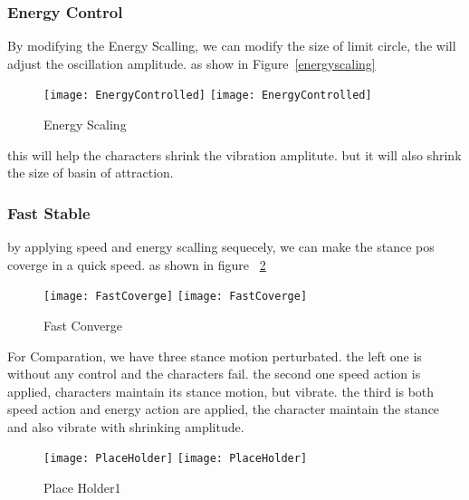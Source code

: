 \subsubsection*{Energy Control}
By modifying the Energy Scalling, we can modify the size of limit circle, the will adjust the oscillation amplitude.
as show in Figure~\ref{energyscaling}
\begin{figure}[!htbp]
  \begin{center}
    \leavevmode
    \ifpdf
      \texttt{[image: EnergyControlled]}
    \else
      \texttt{[image: EnergyControlled]}
    \fi
    \caption{Energy Scaling}
    \label{fig:energyscaling}
\end{center}
\end{figure}

this will help the characters shrink the vibration amplitute.
but it will also shrink the size of basin of attraction.




\subsubsection*{Fast Stable}
by applying speed and energy scalling sequecely, we can make the stance pos coverge in a quick speed.
as shown in figure ~\ref{fig:fastconverg}
\begin{figure}[!htbp]
  \begin{center}
    \leavevmode
    \ifpdf
      \texttt{[image: FastCoverge]}
    \else
      \texttt{[image: FastCoverge]}
    \fi
    \caption{Fast Converge}
    \label{fig:fastconverg}
\end{center}
\end{figure}


For Comparation, we have three stance motion perturbated.
the left one is without any control and the characters fail.
the second one speed action is applied, characters maintain its stance motion, but vibrate.
the third is  both speed action and energy action are applied, the character maintain the stance and also vibrate with shrinking amplitude.

\begin{figure}[!htbp]
  \begin{center}
    \leavevmode
    \ifpdf
      \texttt{[image: PlaceHolder]}
    \else
      \texttt{[image: PlaceHolder]}
    \fi
    \caption{Place Holder1}
    \label{fig:stancefall}
\end{center}
\end{figure}

